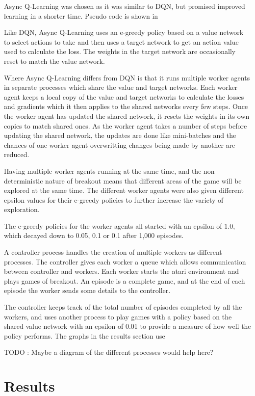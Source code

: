 \documentclass{article}
\begin{document}
Async Q-Learning was chosen as it was similar to DQN, but promised improved learning in a shorter time.
Pseudo code is shown in 

Like DQN, Async Q-Learning uses an e-greedy policy based on a value network to select actions to take and then uses a target network to get an action value used to calculate the loss.
The weights in the target network are occasionally reset to match the value network.

Where Async Q-Learning differs from DQN is that it runs multiple worker agents in separate processes which share the value and target networks.
Each worker agent keeps a local copy of the value and target networks to calculate the losses and gradients which it then applies to the shared networks every few steps.
Once the worker agent has updated the shared network, it resets the weights in its own copies to match shared ones.
As the worker agent takes a number of steps before updating the shared network, the updates are done like mini-batches and the chances of one worker agent overwritting changes being made by another are reduced.

Having multiple worker agents running at the same time, and the non-deterministic nature of breakout means that different areas of the game will be explored at the same time.
The different worker agents were also given different epsilon values for their e-greedy policies to further increase the variety of exploration.

The e-greedy policies for the worker agents all started with an epsilon of 1.0, which decayed down to 0.05, 0.1 or 0.1 after 1,000 episodes.

A controller process handles the creation of multiple workers as different processes.
The controller gives each worker a queue which allows communication between controller and workers.
Each worker starts the atari environment and plays games of breakout.
An episode is a complete game, and at the end of each episode the worker sends some details to the controller.

The controller keeps track of the total number of episodes completed by all the workers, and uses another process to play games with a policy based on the shared value network with an epsilon of 0.01 to provide a measure of how well the policy performs.
The graphs in the results section use

TODO : Maybe a diagram of the different processes would help here?


\section{Results}
\end{document}

